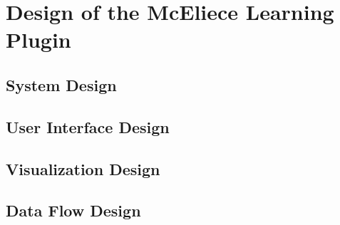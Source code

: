 \section{Design of the McEliece Learning Plugin}
\label{chap:pluginDesign}

\subsection{System Design}
\label{sec:systemDesign}

\subsection{User Interface Design}
\label{sec:uiDesign}

\subsection{Visualization Design}
\label{sec:visualizationDesign}

\subsection{Data Flow Design}
\label{sec:dataFlowDesign}
